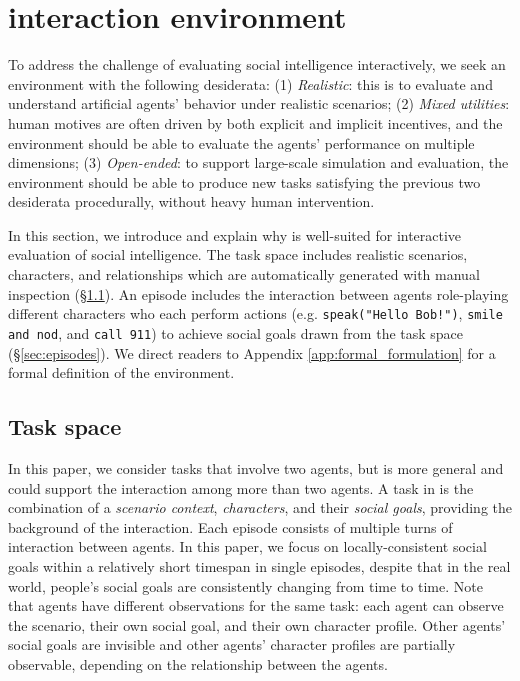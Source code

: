 
\section{\sotopia interaction environment}
\label{sec:sotopia_characters_relationships}
To address the challenge of evaluating social intelligence interactively, we seek an environment with the following desiderata:  (1) \textit{Realistic}: this is to evaluate and understand artificial agents' behavior under realistic scenarios; (2) \textit{Mixed utilities}: human motives are often driven by both explicit and implicit incentives, and the environment should be able to evaluate the agents' performance on multiple dimensions; (3) \textit{Open-ended}: to support large-scale simulation and evaluation, the environment should be able to produce new tasks satisfying the previous two desiderata procedurally, without heavy human intervention.

In this section, we introduce \sotopia and explain why \sotopia is well-suited for interactive evaluation of social intelligence. The task space includes realistic scenarios, characters, and relationships which are automatically generated with manual inspection (\S\ref{sec:task_space}). An episode includes the interaction between agents role-playing different characters who each perform actions (e.g. \texttt{speak("Hello Bob!")}, \texttt{smile and nod}, and \texttt{call 911}) to achieve social goals drawn from the task space (\S\ref{sec:episodes}). We direct readers to Appendix \ref{app:formal_formulation} for a formal definition of the \sotopia environment. 


\subsection{Task space}
\label{sec:task_space}
In this paper, we consider tasks that involve two agents, but \sotopia is more general and could support the interaction among more than two agents. 
A task in \sotopia is the combination of a \emph{scenario context}, \emph{characters}, and their \emph{social goals}, providing the background of the interaction. Each episode consists of multiple turns of interaction between agents. In this paper, we focus on locally-consistent social goals within a relatively short timespan in single episodes, despite that in the real world, people's social goals are consistently changing from time to time. Note that agents have different observations for the same task: each agent can observe the scenario, their own social goal, and their own character profile. Other agents' social goals are invisible and other agents' character profiles are partially observable, depending on the relationship between the agents. 

